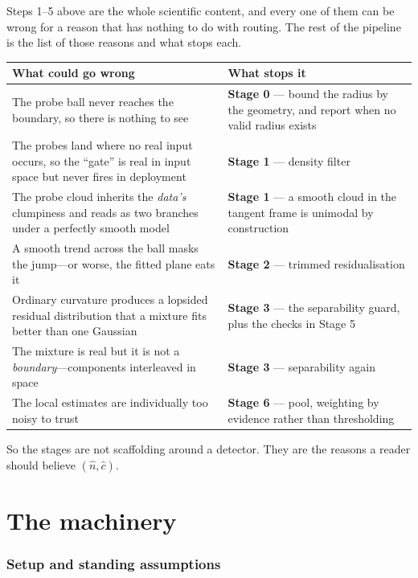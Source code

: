 \documentclass[11pt]{article}
\newcommand{\nhat}{\hat{n}}
\newcommand{\chat}{\hat{c}}
\begin{document}
Steps 1--5 above are the whole scientific content, and every one of them can be wrong for a
reason that has nothing to do with routing. The rest of the pipeline is the list of those
reasons and what stops each.

\begin{table}[h]
\small
\begin{tabular}{@{}p{}p{}@{}}
\toprule
\textbf{\sffamily What could go wrong} & \textbf{\sffamily What stops it}\\
\midrule
The probe ball never reaches the boundary, so there is nothing to see
  & \textbf{Stage 0} --- bound the radius by the geometry, and report when no valid radius exists\\
The probes land where no real input occurs, so the ``gate'' is real in input space but never
fires in deployment
  & \textbf{Stage 1} --- density filter\\
The probe cloud inherits the \emph{data's} clumpiness and reads as two branches under a
perfectly smooth model
  & \textbf{Stage 1} --- a smooth cloud in the tangent frame is unimodal by construction\\
A smooth trend across the ball masks the jump---or worse, the fitted plane eats it
  & \textbf{Stage 2} --- trimmed residualisation\\
Ordinary curvature produces a lopsided residual distribution that a mixture fits better than one
Gaussian
  & \textbf{Stage 3} --- the separability guard, plus the checks in Stage 5\\
The mixture is real but it is not a \emph{boundary}---components interleaved in space
  & \textbf{Stage 3} --- separability again\\
The local estimates are individually too noisy to trust
  & \textbf{Stage 6} --- pool, weighting by evidence rather than thresholding\\
\bottomrule
\end{tabular}
\end{table}

\noindent So the stages are not scaffolding around a detector. They are the reasons a reader
should believe $(\nhat,\chat)$.

\part{The machinery}

\section{Setup and standing assumptions}
\label{sec:setup}
\end{document}

